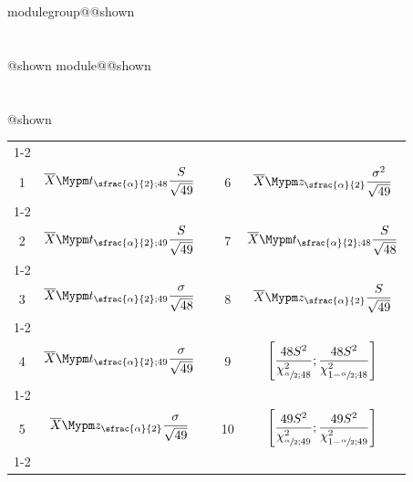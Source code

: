 \documentclass{Evaluation}
\makeatletter
\newcommand{\currentmodulekey}{}
\newcommand{\currentmoduletitle}{}
\newcommand{\currentgroupkey}{}
\newcommand{\currentgrouptitle}{}
\newcommand{\showmoduleifneeded}{%
  \ifx\currentgroupkey\empty\else
    \expandafter\ifx\csname modulegroup@\currentgroupkey @shown\endcsname\relax
      \section*{\currentgrouptitle}%
      \expandafter\gdef\csname modulegroup@\currentgroupkey @shown\endcsname{1}%
    \fi
  \fi
  \expandafter\ifx\csname module@\currentmodulekey @shown\endcsname\relax
    \section*{\currentmoduletitle}%
    \expandafter\gdef\csname module@\currentmodulekey @shown\endcsname{1}%
  \fi
}
\newenvironment{A25}{\showmoduleifneeded}{}
\makeatother
\begin{document}
\begin{questions}
\begin{A25}
\begin{center}
\begin{tabular}{|c|c|c|c|c|}
	\cline{1-2}\cline{4-5}
	&&&&\\[-3mm]
	1 &  $\displaystyle \overline {X}\Mypm t_{\sfrac{\alpha}{2};48}\frac{S}{\sqrt{49}}$
	 & \hspace{0.3cm} &
	 6 &  $\displaystyle \overline {X}\Mypm z_{\sfrac{\alpha}{2}}\frac{\sigma^2}{\sqrt{49}}$
	\\[4mm]
	\cline{1-2}\cline{4-5}
	&&&&\\[-3mm]
	 2 & $\displaystyle \overline {X}\Mypm t_{\sfrac{\alpha}{2};49}\frac{S}{\sqrt{49}}$
	&  &
	 7 & $\displaystyle \overline {X}\Mypm t_{\sfrac{\alpha}{2};48}\frac{S}{\sqrt{48}}$
	\\[4mm]
	\cline{1-2}\cline{4-5}
	&&&&\\[-3mm]
	 3 & $\displaystyle \overline {X}\Mypm t_{\sfrac{\alpha}{2};49}\frac{\sigma}{\sqrt{48}}$
	 &  &
	  8 & $\displaystyle \overline {X}\Mypm z_{\sfrac{\alpha}{2}}\frac{S}{\sqrt{49}}$
	 \\[4mm]
	 \cline{1-2}\cline{4-5}
	 &&&&\\[-3mm]
	   4 & $\displaystyle \overline {X}\Mypm t_{\sfrac{\alpha}{2};49}\frac{\sigma}{\sqrt{49}}$
	 &  &
	  9 & $\displaystyle \left[\frac{48S^2}{\chi_{\sfrac{\alpha}{2};48}^2};\frac{48S^2}{\chi_{1-\sfrac{\alpha}{2};48}^2}\right]$
	 \\[5mm]
	 \cline{1-2}\cline{4-5}
	 &&&&\\[-3mm]
	  5 & $\displaystyle \overline {X}\Mypm z_{\sfrac{\alpha}{2}}\frac{\sigma}{\sqrt{49}}$
	 &  &
	  10 & $\displaystyle \left[\frac{49S^2}{\chi_{\sfrac{\alpha}{2};49}^2};\frac{49S^2}{\chi_{1-\sfrac{\alpha}{2};49}^2}\right]$
	 \\[5mm]
	 \cline{1-2}\cline{4-5}


\end{tabular}

\end{center}


\end{A25}
\end{questions}
\end{document}
